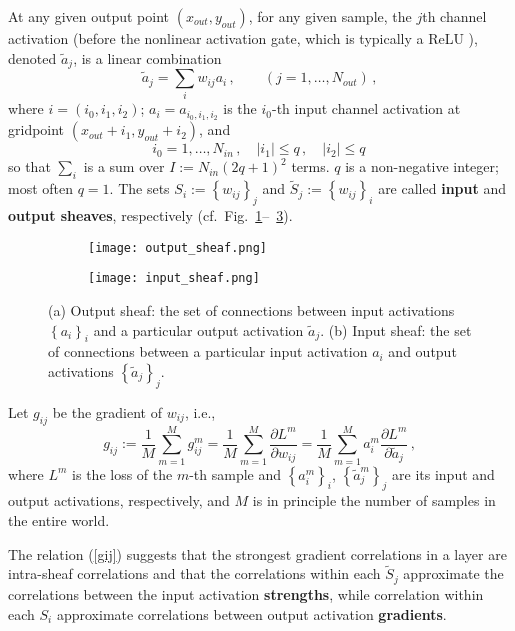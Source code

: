 \documentclass{article} %
\begin{document}
At any given output point $(x_{out}, y_{out})$, for any given sample, the $j$th channel activation (before the nonlinear activation gate, which is typically a ReLU \cite{Goodfellow-et-al-2016}), denoted $\tilde{a}_j$, is a linear combination
\begin{equation}
	\tilde{a}_j = \sum_i w_{ij} a_i\,,\qquad (j = 1, \dots, N_{out})\,,
	\label{tilde_aj}
\end{equation}
where $i = (i_0, i_1, i_2)$; $a_i = a_{i_0,i_1,i_2}$ is the $i_0$-th input channel activation at gridpoint $(x_{out}+i_1, y_{out}+i_2)$, and
$$
	i_0 = 1, \dots, N_{in}\,, \quad |i_1|\leq q\,,\quad |i_2| \leq q\,
$$
so that $\sum_i$ is a sum over $I := N_{in} (2 q + 1)^2$ terms. $q$ is a non-negative integer; most often $q = 1$. The sets $S_i := \left\{w_{ij}\right\}_j$ and
$\tilde{S}_j := \left\{w_{ij}\right\}_i$ are called \textbf{input} and \textbf{output sheaves}, respectively (cf.~Fig.~\ref{fig:input_sheaf}--~\ref{fig:output_sheaf}).
\begin{figure}[htbp]
\centering
\begin{subfigure}[b]{0.55\textwidth}
  \texttt{[image: output\_sheaf.png]}
   \caption{}
   \label{fig:input_sheaf} 
\end{subfigure}

\begin{subfigure}[b]{0.55\textwidth}
  \texttt{[image: input\_sheaf.png]}
   \caption{}
   \label{fig:output_sheaf}
\end{subfigure}
\caption[Sheaves.]{(a) Output sheaf: the set of connections between input activations $\left\{a_i\right\}_i$ and a particular output activation $\tilde{a}_j$. (b) Input sheaf: the set of connections between a particular input activation $a_i$ and output activations $\left\{\tilde{a}_j\right\}_j$.}
\end{figure}
Let $g_{ij}$ be the gradient of $w_{ij}$, i.e.,
\begin{equation}
	g_{ij} := \frac{1}{M} \sum_{m=1}^M g^m_{ij} = 
	\frac{1}{M} \sum_{m=1}^M \frac{\partial L^m}{\partial w_{ij}} =
	\frac{1}{M} \sum_{m=1}^M a^m_i \frac{\partial L^m}{\partial \tilde{a}_j}\,,
	\label{gij}
\end{equation}
where $L^m$ is the loss of the $m$-th sample and $\left\{a^m_i \right\}_i$, $\left\{\tilde{a}^m_j \right\}_j$ are its input and output activations, respectively, and $M$ is in principle the number of samples in the entire world. 

The relation (\ref{gij}) suggests that the strongest gradient correlations in a layer are intra-sheaf correlations and that the correlations within each $\tilde{S}_j$ approximate the correlations between the input activation \textbf{strengths}, while correlation within each $S_i$ approximate correlations between output activation \textbf{gradients}.
\end{document}
